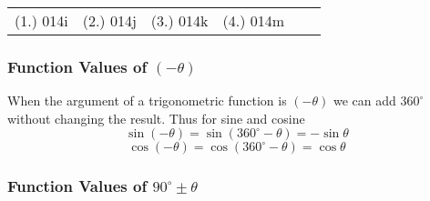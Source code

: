 {%
\par \practiceinfo
\par \begin{tabular}[h]{cccccc}
(1.)	014i	&
(2.)	014j	&
(3.)	014k	&
(4.)	014m	&
\end{tabular}}

\subsubsection{Function Values of $(-\theta)$}
When the argument of a trigonometric function is $(-\theta)$ we can add $360^\circ$ without changing the result. Thus for sine and cosine
\[\sin (-\theta) = \sin (360^\circ-\theta) = -\sin\theta\]
\[ \cos (-\theta) = \cos(360^\circ-\theta) = \cos\theta\]

\subsubsection{Function Values of $90^\circ \pm \theta$}

